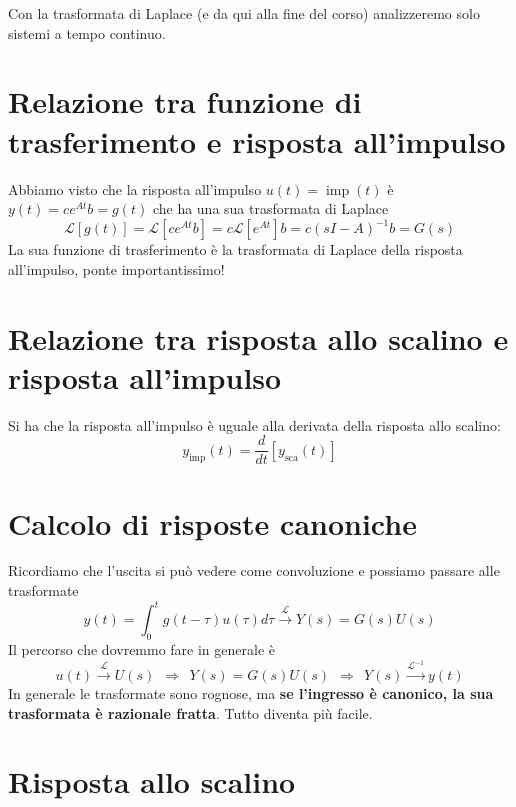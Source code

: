 \documentclass[10pt,a4paper]{book}
\DeclareMathOperator{\imp}{imp}
\DeclareMathOperator{\sca}{sca}
\begin{document}
Con la trasformata di Laplace (e da qui alla fine del corso) analizzeremo solo sistemi a tempo continuo.
\section{Relazione tra funzione di trasferimento e risposta all'impulso}

Abbiamo visto che la risposta all'impulso $u(t) =\imp(t)$ è $y(t) =ce^{At} b=g(t)$ che ha una sua trasformata di Laplace
\begin{equation*}
	\mathcal{L}[ g(t)] =\mathcal{L}\left[ ce^{At} b\right] =c\mathcal{L}\left[ e^{At}\right] b=c(sI-A)^{-1} b=G(s)
\end{equation*}
La sua funzione di trasferimento è la trasformata di Laplace della risposta all'impulso, ponte importantissimo!
\section{Relazione tra risposta allo scalino e risposta all'impulso}

Si ha che la risposta all'impulso è uguale alla derivata della risposta allo scalino:
\begin{equation*}
	\boxed{y_{\imp}(t) =\frac{d}{dt}[ y_{\sca}(t)]}
\end{equation*}
\section{Calcolo di risposte canoniche}

Ricordiamo che l'uscita si può vedere come convoluzione e possiamo passare alle trasformate
\begin{equation*}
	y(t) =\int ^t_0 g(t-\tau) u(\tau) d\tau \xrightarrow{\mathcal{L}}\boxed{Y(s) =G(s) U(s)}
\end{equation*}
Il percorso che dovremmo fare in generale è
\begin{equation*}
	u(t)\xrightarrow{\mathcal{L}} U(s) \ \ \Rightarrow \ \ Y(s) =G(s) U(s) \ \ \Rightarrow \ \ Y(s)\xrightarrow{\mathcal{L}^{-1}} y(t)
\end{equation*}
In generale le trasformate sono rognose, ma \textbf{se l'ingresso è canonico, la sua trasformata è razionale fratta}. Tutto diventa più facile.
\section{Risposta allo scalino}
\end{document}
